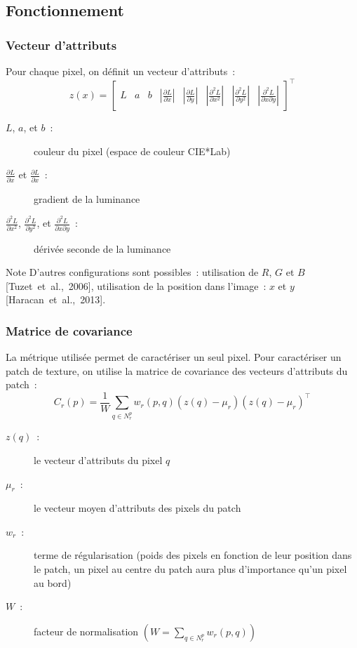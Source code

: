 \documentclass{beamer}
\begin{document}
\subsection{Fonctionnement}
\begin{frame}
    \frametitle{Vecteur d'attributs}
    Pour chaque pixel, on définit un vecteur d'attributs :
    \[
        z(x) =
        \begin{bmatrix}
            L &
            a &
            b &
            |\frac{\partial L}{\partial x}|&
            |\frac{\partial L}{\partial y}|&
            |\frac{\partial^2 L}{\partial x^2}|&
            |\frac{\partial^2 L}{\partial y^2}|&
            |\frac{\partial^2 L}{\partial x \partial y}|
        \end{bmatrix}^\top
    \]
    \vfill
    \begin{description}
        \item[$L$, $a$, et $b$ :] couleur du pixel (espace de couleur CIE*Lab)
        \item[$\frac{\partial L}{\partial x}$ et $\frac{\partial L}{\partial x}$ :] gradient de la luminance
        \item[$\frac{\partial^2 L}{\partial x^2}$, $\frac{\partial^2 L}{\partial y^2}$, et $\frac{\partial^2 L}{\partial x \partial y}$ :] dérivée seconde de la luminance
    \end{description}

    \vfill

    \begin{block}{Note}
        D'autres configurations sont possibles : utilisation de $R$, $G$ et $B$ {\tiny[Tuzet et al., 2006]}, utilisation de la position dans l'image : $x$ et $y$ {\tiny[Haracan et al., 2013]}.
    \end{block}
\end{frame}

\begin{frame}
    \frametitle{Matrice de covariance}
    La métrique utilisée permet de caractériser un seul pixel. Pour caractériser un patch de texture, on utilise la matrice de covariance des vecteurs d'attributs du patch :
    \[
        C_r (p) = \frac{1}{W} \sum_{q \in N_r^p} w_r (p, q) ( z(q) - \mu_r) {(z(q) - \mu_r)}^\top
    \]
    \begin{description}
        \item[$z(q)$ :] le vecteur d'attributs du pixel $q$
        \item[$\mu_r$ :] le vecteur moyen d'attributs des pixels du patch
        \item[$w_r$ :] terme de régularisation (poids des pixels en fonction de leur position dans le patch, un pixel au centre du patch aura plus d'importance qu'un pixel au bord)
        \item[$W$ :] facteur de normalisation $(W = \sum_{q \in N_r^p} w_r(p, q))$
    \end{description}
\end{frame}
\end{document}
